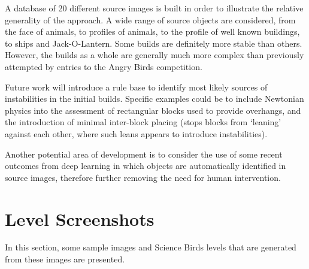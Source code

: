 \documentclass{dalthesis}
\begin{document}
A database of 20 different source images is built in order to illustrate the relative generality of the approach. A wide range of source objects are considered, from the face of animals, to profiles of animals, to the profile of well known buildings, to ships and Jack-O-Lantern. Some builds are definitely more stable than others. However, the builds as a whole are generally much more complex than previously attempted by entries to the Angry Birds competition.

Future work will introduce a rule base to identify most likely sources of instabilities in the initial builds. Specific examples could be to include Newtonian physics into the assessment of rectangular blocks used to provide overhangs, and the introduction of minimal inter-block placing (stops blocks from `leaning' against each other, where such leans appears to introduce instabilities).

Another potential area of development is to consider the use of some recent outcomes from deep learning in which objects are automatically identified in source images, therefore further removing the need for human intervention.

\appendix
\chapter{Level Screenshots}\label{sec:appendix}

In this section, some sample images and Science Birds levels that are generated from these images are presented.
\end{document}
